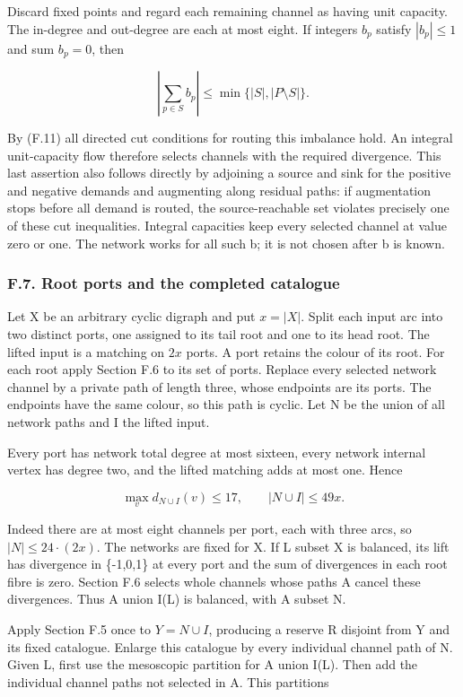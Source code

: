 \documentclass[english,11pt,a4paper]{article}
\begin{document}
Discard fixed points and regard each remaining channel as having unit capacity. The in-degree and out-degree are each at most eight. If integers \(b_{p}\) satisfy \(|b_{p}|\le 1\) and sum \(b_{p}=0\), then

\[\left|\sum_{p\in S}b_p\right|\le\min\{|S|,|P\setminus S|\}.\]

By (F.11) all directed cut conditions for routing this imbalance hold. An integral unit-capacity flow therefore selects channels with the required divergence. This last assertion also follows directly by adjoining a source and sink for the positive and negative demands and augmenting along residual paths: if augmentation stops before all demand is routed, the source-reachable set violates precisely one of these cut inequalities. Integral capacities keep every selected channel at value zero or one. The network works for all such b; it is not chosen after b is known.

\subsubsection{F.7. Root ports and the completed catalogue}\label{f.7.-root-ports-and-the-completed-catalogue}

Let X be an arbitrary cyclic digraph and put \(x=|X|\). Split each input arc into two distinct ports, one assigned to its tail root and one to its head root. The lifted input is a matching on \(2x\) ports. A port retains the colour of its root. For each root apply Section F.6 to its set of ports. Replace every selected network channel by a private path of length three, whose endpoints are its ports. The endpoints have the same colour, so this path is cyclic. Let N be the union of all network paths and I the lifted input.

Every port has network total degree at most sixteen, every network internal vertex has degree two, and the lifted matching adds at most one. Hence

\[\max_v d_{N\cup I}(v)\le17,\qquad |N\cup I|\le49x.\tag{F.12}\]

Indeed there are at most eight channels per port, each with three arcs, so \(|N|\le 24\cdot (2x)\). The networks are fixed for X. If L subset X is balanced, its lift has divergence in \{-1,0,1\} at every port and the sum of divergences in each root fibre is zero. Section F.6 selects whole channels whose paths A cancel these divergences. Thus A union I(L) is balanced, with A subset N.

Apply Section F.5 once to \(Y=N\cup I\), producing a reserve R disjoint from Y and its fixed catalogue. Enlarge this catalogue by every individual channel path of N. Given L, first use the mesoscopic partition for A union I(L). Then add the individual channel paths not selected in A. This partitions
\end{document}
